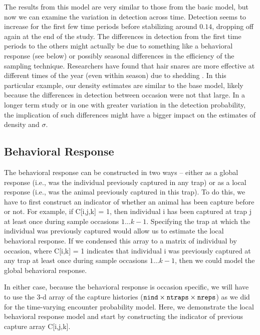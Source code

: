 The results from this model are very similar to those from the basic
model, but now we can examine the variation in detection across time.
Detection seems to
increase for the first few time periods before stabilizing around $0.14$, dropping off again at the end of the study.
The differences in detection from the first time periods to the others might
actually be due to something like a behavioral response (see below) or possibly seasonal
differences in the efficiency of the sampling technique.
Researchers have found that hair snares are more effective at different
times of the year (even within season) due to shedding \citep{wegan_etal:inpress}.
In this particular example, our density estimates are
similar to the base model, likely because the differences in detection between occasion were not that large.
In a longer term study or in one with greater variation in the detection probability,
the implication of such differences might have a bigger impact on the estimates of density
and $\sigma$.

\subsection{Behavioral Response}

The behavioral response can be constructed in two ways -- either as a
global response (i.e., was the individual previously captured in any trap) or
as a local response (i.e., was the animal previously captured in this
trap).  To do this, we have to first
construct an indicator of whether an animal has been capture before or not.  For
example, if C[i,j,k] = 1, then individual i has been captured at trap j
 at least once during
sample occasions $1 \dots k-1$.  Specifying the trap at which the individual was
previously captured would allow us to estimate the local behavioral response.  If
we condensed this array to a matrix of individual by occasion, where C[i,k] = 1 indicates
that individual i was previously captured at any trap at least once during
sample occasions $1 \dots k-1$, then we
could model the global behavioral response.

In either case, because the behavioral response is occasion specific, we will have to use the 3-d array of the
capture histories ($\mbox{\tt nind} \times \mbox{\tt ntraps} \times
\mbox{\tt nreps}$) as we did for the time-varying encounter probability
model.
Here, we demonstrate the local behavioral response model and start by constructing the
indicator of previous capture array C[i,j,k].

